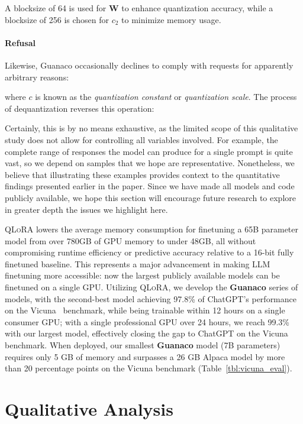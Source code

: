 A blocksize of 64 is used for $\mathbf{W}$ to enhance quantization accuracy, while a blocksize of 256 is chosen for $c_2$ to minimize memory usage.

\paragraph{Refusal} Likewise, {Guanaco} occasionally declines to comply with requests for apparently arbitrary reasons:

where $c$ is known as the {\em quantization constant} or {\em quantization scale}. The process of dequantization reverses this operation:

Certainly, this is by no means exhaustive, as the limited scope of this qualitative study does not allow for controlling all variables involved. For example, the complete range of responses the model can produce for a single prompt is quite vast, so we depend on samples that we hope are representative. Nonetheless, we believe that illustrating these examples provides context to the quantitative findings presented earlier in the paper. Since we have made all models and code publicly available, we hope this section will encourage future research to explore in greater depth the issues we highlight here.

\textsc{QLoRA} lowers the average memory consumption for finetuning a 65B parameter model from over 780GB of GPU memory to under 48GB, all without compromising runtime efficiency or predictive accuracy relative to a 16-bit fully finetuned baseline. This represents a major advancement in making LLM finetuning more accessible: now the largest publicly available models can be finetuned on a single GPU. Utilizing \textsc{QLoRA}, we develop the \textbf{Guanaco} series of models, with the second-best model achieving 97.8\% of ChatGPT’s performance on the Vicuna~\citep{vicuna2023} benchmark, while being trainable within 12 hours on a single consumer GPU; with a single professional GPU over 24 hours, we reach 99.3\% with our largest model, effectively closing the gap to ChatGPT on the Vicuna benchmark. When deployed, our smallest \textbf{Guanaco} model (7B parameters) requires only 5 GB of memory and surpasses a 26 GB Alpaca model by more than 20 percentage points on the Vicuna benchmark (Table~\ref{tbl:vicuna_eval}).

\section{Qualitative Analysis}


